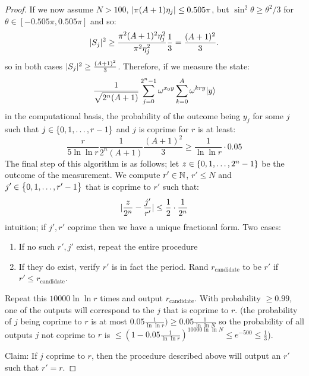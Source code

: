 \begin{proof}
    If we now assume $N > 100$, $\lvert \pi(A+1)\eta_j \rvert \leq 0.505\pi$, but $\sin^2\theta \geq \theta^2/3$ for $\theta \in [-0.505\pi, 0.505\pi]$ and so:
    \begin{equation}
        \lvert S_j \rvert^2 \geq \frac{\pi^2(A+1)^2\eta_j^2}{\pi^2\eta_j^2} \frac{1}{3} = \frac{(A+1)^2}{3}.
    \end{equation}
    so in both cases $\lvert S_j \rvert^2 \geq \frac{(A+1)^2}{3}$. Therefore, if we measure the state:
    \begin{equation}
        \frac{1}{\sqrt{2^n(A+1)}}\sum_{j=0}^{2^n-1}\omega^{x_0 y}\sum_{k=0}^A \omega^{kry}\lvert y \rangle
    \end{equation}
    in the computational basis, the probability of the outcome being $y_j$ for some $j$ such that $j \in \set{0, 1, \ldots, r-1}$ and $j$ is coprime for $r$ is at least:
    \begin{equation}
        \frac{r}{5\ln\ln r}\frac{1}{2^n(A+1)}\frac{(A+1)^2}{3} \geq \frac{1}{\ln\ln r} \cdot 0.05
    \end{equation}
    The final step of this algorithm is as follows; let $z \in \set{0, 1, \ldots, 2^{n}-1}$ be the outcome of the measurement. We compute $r' \in \mathbb{N}$, $r' \leq N$ and $j' \in \set{0, 1, \ldots, r'-1}$ that is coprime to $r'$ such that:
    \begin{equation}
        \lvert \frac{z}{2^n} - \frac{j'}{r'} \rvert \leq \frac{1}{2} \cdot \frac{1}{2^n}
    \end{equation}
    intuition; if $j', r'$ coprime then we have a unique fractional form. Two cases:
    \begin{enumerate}
        \item If no such $r', j'$ exist, repeat the entire procedure
        \item If they do exist, verify $r'$ is in fact the period. Rand $r_{\text{candidate}}$ to be $r'$ if $r' \leq r_{\text{candidate}}$. 
    \end{enumerate}
    Repeat this $10000\ln\ln r$ times and output $r_{\text{candidate}}$. With probability $\geq 0.99$, one of the outputs will correspond to the $j$ that is coprime to $r$. (the probability of $j$ being coprime to $r$ is at most $0.05\frac{1}{\ln\ln r}) \geq 0.05\frac{1}{\ln\ln N}$ so the probability of all outputs $j$ not coprime to $r$ is $\leq \left(1 - 0.05\frac{1}{\ln\ln r}\right)^{10000\ln\ln N} \leq e^{-500} \leq \frac{1}{3}$).

    Claim: If $j$ coprime to $r$, then the procedure described above will output an $r'$ such that $r' = r$. 

\end{proof}
